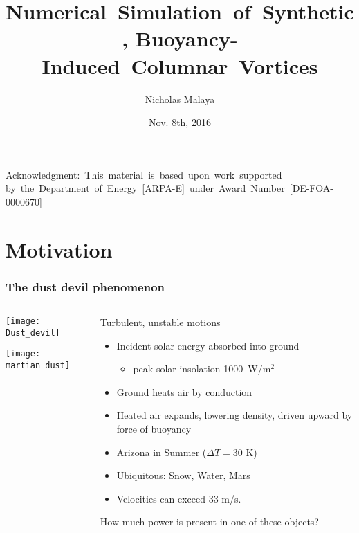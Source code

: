 \documentclass[mathserif]{beamer}
\date{Nov. 8th, 2016}
\author[Nicholas Malaya]{Nicholas Malaya}
\institute{Department of Mechanical Engineering \\ The University of
Texas at Austin}
\title[Dissertation Defense]{%
    \mbox{Numerical Simulation of Synthetic,}
    \mbox{Buoyancy-Induced Columnar Vortices}
}
\newcommand{\rarrow}{\rightarrow}
\begin{document}

\begin{frame}
%
\titlepage{}


\mbox{{\scriptsize Acknowledgment: This material is based upon work
 supported}}
\mbox{{\scriptsize by the Department of Energy [ARPA-E] under Award
 Number [DE-FOA-0000670]}} 
%
\end{frame}


 \section{Motivation}

\begin{frame}
  \frametitle{The dust devil phenomenon}
  \begin{columns}[]
    \begin{column}{0.45\linewidth}
      \begin{center}
        \texttt{[image: Dust\_devil]}
      \end{center}
      \begin{center}
        \texttt{[image: martian\_dust]}
      \end{center}
    \end{column}
    \begin{column}{0.55\linewidth}

      \begin{block}{Turbulent, unstable motions}
        \begin{itemize}
	 \item Incident solar energy absorbed into ground
	       \begin{itemize}
		\item peak solar insolation 1000~W/$\text{m}^2$ 
	       \end{itemize}
	 \item Ground heats air by conduction
	 \item Heated air expands, lowering density, 
	       driven upward by force of buoyancy
	 \item Arizona in Summer ($\Delta T= 30$ K) 
	 \item Ubiquitous: Snow, Water, Mars
	 \item Velocities can exceed 33 m/s.
        \end{itemize}
      \end{block}
      How much power is present in one of these objects? 
      \end{column}
    \end{columns}
  \end{frame}
\end{document}
